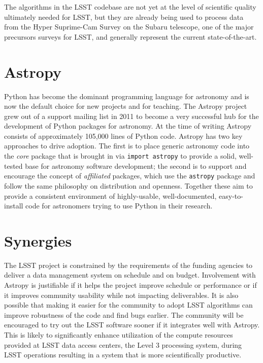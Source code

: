 \documentclass[]{spie}  %
\begin{document}
The algorithms in the LSST codebase are not yet at the level of scientific quality ultimately needed for LSST, but they are already being used to process data from the Hyper Suprime-Cam Survey on the Subaru telescope\cite{2012SPIE.8446E..0ZM}, one of the major precursors surveys for LSST, and generally represent the current state-of-the-art.


\section{Astropy}

Python has become the dominant programming language for astronomy\cite{2000ASPC..216...59G,2006ASPC..351..343H,2006ASPC..351..497K,2011ASPC..442..425G,2012SPIE.8451E..02J} and is now the default choice for new projects and for teaching.
The Astropy\cite{2013A&A...558A..33A} project grew out of a support mailing list in 2011 to become a very successful hub for the development of Python packages for astronomy.
At the time of writing Astropy consists of approximately 105,000 lines of Python code.
Astropy has two key approaches to drive adoption.
The first is to place generic astronomy code into the \emph{core} package that is brought in via \texttt{import astropy} to provide a solid, well-tested base for astronomy software development; the second is to support and encourage the concept of \emph{affiliated} packages, which use the \texttt{astropy} package and follow the same philosophy on distribution and openness.
Together these aim to provide a consistent environment of highly-usable, well-documented, easy-to-install code for astronomers trying to use Python in their research.

\section{Synergies}

The LSST project is constrained by the requirements of the funding agencies to deliver a data management system on schedule and on budget.
Involvement with Astropy is justifiable if it helps the project improve schedule or performance or if it improves community usability while not impacting deliverables.
It is also possible that making it easier for the community to adopt LSST algorithms can improve robustness of the code and find bugs earlier.
The community will be encouraged to try out the LSST software sooner if it integrates well with Astropy.
This is likely to significantly enhance utilization of the compute resources provided at LSST data access centers, the Level 3 processing system, during LSST operations resulting in a system that is more scientifically productive.
\end{document}
